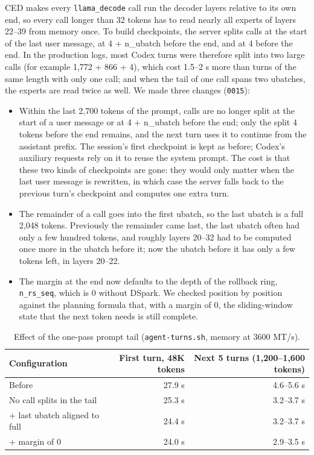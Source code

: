 \documentclass[11pt,a4paper]{article}
\newcommand{\code}[1]{\texttt{#1}}
\begin{document}
CED makes every \code{llama\_decode} call run the decoder layers relative to its own end, so every call longer than 32 tokens has to read nearly all experts of layers 22--39 from memory once. To build checkpoints, the server splits calls at the start of the last user message, at 4 + n\_ubatch before the end, and at 4 before the end. In the production logs, most Codex turns were therefore split into two large calls (for example 1,772 + 866 + 4), which cost 1.5--2 s more than turns of the same length with only one call; and when the tail of one call spans two ubatches, the experts are read twice as well. We made three changes (\code{0015}):

\begin{itemize}
  \item Within the last 2,700 tokens of the prompt, calls are no longer split at the start of a user message or at 4 + n\_ubatch before the end; only the split 4 tokens before the end remains, and the next turn uses it to continue from the assistant prefix. The session's first checkpoint is kept as before; Codex's auxiliary requests rely on it to reuse the system prompt. The cost is that these two kinds of checkpoints are gone: they would only matter when the last user message is rewritten, in which case the server falls back to the previous turn's checkpoint and computes one extra turn.
  \item The remainder of a call goes into the first ubatch, so the last ubatch is a full 2,048 tokens. Previously the remainder came last, the last ubatch often had only a few hundred tokens, and roughly layers 20--32 had to be computed once more in the ubatch before it; now the ubatch before it has only a few tokens left, in layers 20--22.
  \item The margin at the end now defaults to the depth of the rollback ring, \code{n\_rs\_seq}, which is 0 without DSpark. We checked position by position against the planning formula that, with a margin of 0, the sliding-window state that the next token needs is still complete.
\end{itemize}

\begin{table}[h]
  \centering
  \small
  \caption{Effect of the one-pass prompt tail (\code{agent-turns.sh}, memory at 3600 MT/s).}
  \label{tab:tailmerge}
  \begin{tabular}{@{}l r r@{}}
    \toprule
    Configuration & First turn, 48K tokens & Next 5 turns (1,200--1,600 tokens) \\
    \midrule
    Before & 27.9 s & 4.6--5.6 s \\
    No call splits in the tail & 25.3 s & 3.2--3.7 s \\
    + last ubatch aligned to full & 24.4 s & 3.2--3.7 s \\
    + margin of 0 & 24.0 s & 2.9--3.5 s \\
    \bottomrule
  \end{tabular}
\end{table}
\end{document}
